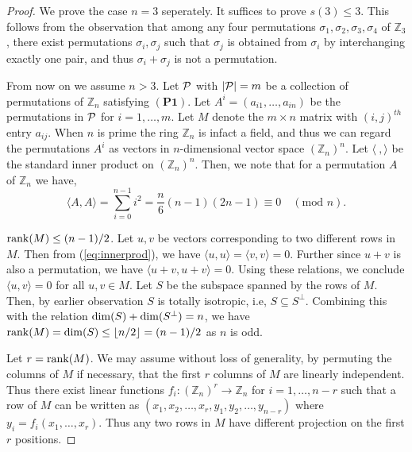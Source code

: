 \documentclass[12pt]{article}
\newcommand{\rk}[1]{{\rm rank}(#1)}
\newcommand{\dimn}[1]{{\rm dim}(#1)}
\newcommand{\mb}{\mathbb}
\begin{document}
\begin{proof}
We prove the case $n=3$ seperately. It suffices to prove $s(3)\leq 3$. This
follows from the observation that among any four permutations
$\sigma_1,\sigma_2,\sigma_3,\sigma_4$ of
$\mb{Z}_3$, there exist permutations $\sigma_i,\sigma_j$ such that
$\sigma_j$ is obtained from $\sigma_i$ by interchanging exactly one pair,
and thus 
$\sigma_i+\sigma_j$ is not a permutation.

From now on we assume $n>3$. Let ${\cal P}$ with $|{\cal P}|=m$ be a collection of permutations of
${\mathbb Z}_n$ satisfying $\mathbf{(P1)}$. Let
$A^i=(a_{i1},\ldots,a_{in})$ be the permutations in ${\cal P}$ for
$i=1,\ldots,m$. Let $M$ denote the $m\times n$ matrix with $(i,j)^{th}$
entry $a_{ij}$. When $n$ is prime the ring $\mb{Z}_n$ is infact a field,
and thus we can regard the permutations $A^i$ as vectors in $n$-dimensional
vector space $(\mb{Z}_n)^n$. Let $\langle\:,\rangle$ be the standard inner product
on $({\mathbb Z}_n)^n$. Then, we note that for a permutation $A$ of
$\mathbb{Z}_n$ we have,
\begin{equation}\label{eq:innerprod}
\langle A,A\rangle = \sum_{i=0}^{n-1} i^2 = \frac{n}{6}(n-1)(2n-1) \equiv 0\quad (\text{mod } n).
\end{equation}

 $\rk{M}\leq (n-1)/2$. Let $u,v$ be vectors
corresponding to two different rows in $M$. Then from
(\ref{eq:innerprod}), we have $\langle u,u\rangle = \langle v,v\rangle=0$.
Further since $u+v$ is also a permutation, we have $\langle u+v,u+v\rangle=0$. Using these
relations, we conclude $\langle u,v\rangle = 0$ for all $u,v\in M$. Let
$S$ be the subspace spanned by the rows of $M$. Then, by earlier
observation $S$ is totally isotropic, i.e, $S\subseteq S^\perp$. 
Combining this with the relation
$\dimn{S}+\dimn{S^\perp}=n$, we have $\rk{M}=\dimn{S}\leq \lfloor
n/2\rfloor = (n-1)/2$ as $n$ is odd.

Let $r = \rk{M}$. We may assume without loss of generality, by permuting the columns of $M$ if necessary, that the first $r$ columns of $M$ are linearly independent. 
Thus there exist linear functions $f_i: (\mathbb{Z}_n)^r\rightarrow
\mathbb{Z}_n$ for $i=1,\ldots,n-r$ such that a row of $M$ can be written
as $(x_1,x_2,\ldots,x_r,y_1,y_2,\ldots,y_{n-r})$ where
$y_i=f_i(x_1,\ldots,x_r)$. Thus any two rows in $M$
have different projection on the first $r$ positions.  


\end{proof}
\end{document}
